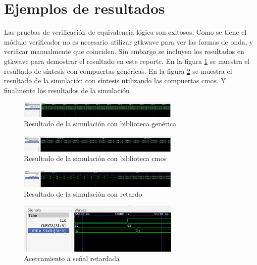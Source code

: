 \documentclass {article}
\begin{document}
\section{Ejemplos de resultados}

Las pruebas de verificación de equivalencia lógica son exitosos. Como
se tiene el módulo verificador no es necesario utilizar gtkwave para
ver las formas de onda, y verificar manualmente que coinciden. Sin
embargo se incluyen los resultados en gtkwave para demostrar el
resultado en este reporte. En la figura \ref{fig:rtll} se muestra
el resultado de síntesis con compuertas genéricas. En la figura 
\ref{fig:cmos} se muestra el resultado de la simulación con síntesis
utilizando las compuertas cmos. Y finalmente los resultados de la 
simulación 

\begin{figure}[ht!]
  \centering
  \includegraphics[width=0.7\textwidth]{./figures/gtkwave_rtll.png}
  \caption{Resultado de la simulación con biblioteca genérica}
  \label{fig:rtll}
\end{figure}

\begin{figure}[ht!]
  \centering
  \includegraphics[width=0.7\textwidth]{./figures/gtkwave_cmos_lib.png}
  \caption{Resultado de la simulación con biblioteca cmos}
  \label{fig:cmos}
\end{figure}

\begin{figure}[ht!]
  \centering
  \includegraphics[width=0.7\textwidth]{./figures/gtkwave_delay.png}
  \caption{Resultado de la simulación con retardo}
  \label{fig:delay}
\end{figure}

\begin{figure}[ht!]
  \centering
  \includegraphics[width=0.7\textwidth]{./figures/gtkwave_restraso_entre_senales.png}
  \caption{Acercamiento a señal retardada}
  \label{fig:delay_zoom}
\end{figure}
\end{document}
